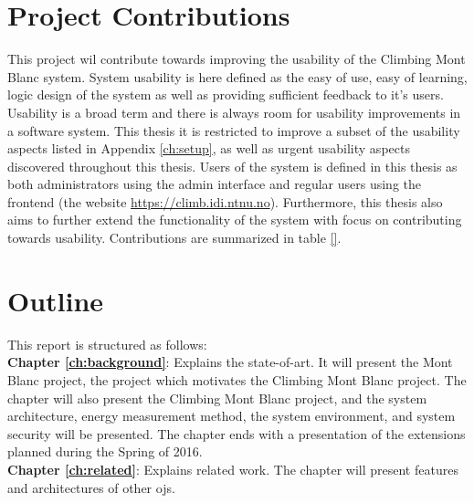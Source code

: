 \section{Project Contributions}
\label{sec:cont}
This project wil contribute towards improving the usability of the Climbing Mont Blanc system. System usability is here defined as the easy of use, easy of learning, logic design of the system as well as providing sufficient feedback to it's users. Usability is a broad term and there is always room for usability improvements in a software system. This thesis it is restricted to improve a subset of the usability aspects listed in Appendix \ref{ch:setup}, as well as urgent usability aspects discovered throughout this thesis. Users of the system is defined in this thesis as both administrators using the admin interface and regular users using the frontend (the website \url{https://climb.idi.ntnu.no}). Furthermore, this thesis also aims to further extend the functionality of the system with focus on contributing towards usability. Contributions are summarized in table \ref{}.



\section{Outline}
\label{sec:out}
This report is structured as follows:\\

\noindent
\textbf{Chapter \ref{ch:background}}: Explains the state-of-art. It will present the Mont Blanc project, the project which motivates the Climbing Mont Blanc project. The chapter will also present the Climbing Mont Blanc project, and the system architecture, energy measurement method, the system environment, and system security will be presented. The chapter ends with a presentation of the extensions planned during the Spring of 2016. \\

\textbf{Chapter \ref{ch:related}}: Explains related work. The chapter will present features and architectures of other \gls{ojs}.     

